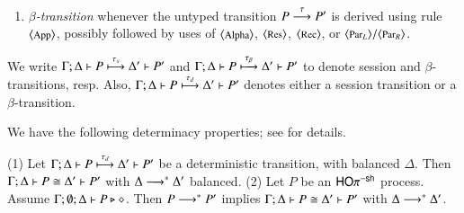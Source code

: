 {\begin{definition}
\begin{enumerate}[$-$]
		\item	{\em $\beta$-transition}
				whenever the untyped transition $P \stackrel{\tau}{\longrightarrow} P'$
				is derived using rule ${\footnotesize \langle \textrm{App} \rangle}$,
				possibly followed by uses of  ${\footnotesize \langle \textrm{Alpha} \rangle}$, ${\footnotesize \langle \textrm{Res} \rangle}$, ${\footnotesize \langle \textrm{Rec} \rangle}$, or ${\footnotesize \langle \textrm{Par${}_L$} \rangle}/
				{\footnotesize \langle \textrm{Par${}_R$} \rangle}$.
	\end{enumerate}
%
	We write
	$\Gamma; \Delta \vdash P \stackrel{\tau_{s}}{\longmapsto} \Delta' \vdash P'$
	and 
	$\Gamma; \Delta \vdash P \stackrel{\tau_{\beta}}{\longmapsto} \Delta' \vdash P'$
	to denote session and $\beta$-transitions, resp. Also, 
	 $\Gamma; \Delta \vdash P \stackrel{\tau_{d}}{\longmapsto} \Delta' \vdash P'$ denotes
	either a session transition or a $\beta$-transition.
\end{definition}
%

We have the following determinacy properties; see   for details.

\begin{lemma}\rm
	\label{lem:tau_inert}
	(1)
				Let $\Gamma; \Delta \vdash P \stackrel{\tau_{d}}{\longmapsto} \Delta' \vdash P'$ be a deterministic transition,
				with balanced $\Delta$. Then 
				$\Gamma; \Delta \vdash P \cong \Delta'\vdash P'$ 
				with $\Delta \longrightarrow^\ast \Delta'$ balanced.
				(2) Let $P$ be an $\mathsf{HO}\pi^{-\mathsf{sh}}$ process. 
				Assume $\Gamma; \emptyset; \Delta \vdash P \triangleright \diamond$. Then 
				$P \longrightarrow^\ast P'$ implies $\Gamma; \Delta \vdash 
				P \cong \Delta'\vdash P'$ with $\Delta \longrightarrow^\ast \Delta'$. 
\end{lemma}



}
